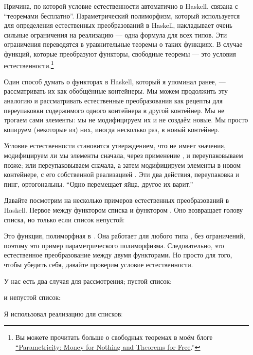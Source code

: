 Причина, по которой условие естественности автоматично в Haskell, связана
с ``теоремами бесплатно''. Параметрический полиморфизм, который используется для
определения естественных преобразований в Haskell, накладывает очень сильные
ограничения на реализацию --- одна формула для всех типов. Эти
ограничения переводятся в уравнительные теоремы о таких функциях. В
случае функций, которые преобразуют функторы, свободные теоремы --- это
условия естественности.\footnote{
  Вы можете прочитать больше о свободных теоремах в моём
  блоге \href{https://bartoszmilewski.com/2014/09/22/parametricity-money-for-nothing-and-theorems-for-free/}{``Parametricity:
    Money for Nothing and Theorems for Free}.''}

Один способ думать о функторах в Haskell, который я упоминал ранее,
--- рассматривать их как обобщённые контейнеры. Мы можем продолжить эту аналогию
и рассматривать естественные преобразования как рецепты для переупаковки
содержимого одного контейнера в другой контейнер. Мы не трогаем
сами элементы: мы не модифицируем их и не создаём новые.
Мы просто копируем (некоторые из) них, иногда несколько раз, в
новый контейнер.

Условие естественности становится утверждением, что не имеет значения,
модифицируем ли мы элементы сначала, через применение
, и переупаковываем позже; или переупаковываем сначала, а затем модифицируем
элементы в новом контейнере, с его собственной реализацией
. Эти два действия, переупаковка и пинг,
ортогональны. ``Одно перемещает яйца, другое их варит.''

Давайте посмотрим на несколько примеров естественных преобразований в Haskell.
Первое между функтором списка и функтором . Оно
возвращает голову списка, но только если список непустой:

Это функция, полиморфная в . Она работает для любого типа
, без ограничений, поэтому это пример параметрического
полиморфизма. Следовательно, это естественное преобразование между двумя
функторами. Но просто для того, чтобы убедить себя, давайте проверим условие
естественности.

У нас есть два случая для рассмотрения; пустой список:


и непустой список:


Я использовал реализацию  для списков:

